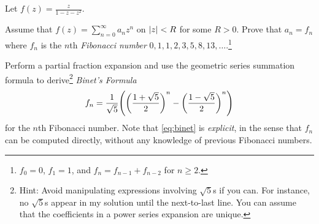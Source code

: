 \documentclass{../math135}
\begin{document}
\begin{exercise}
	Let \(f(z) = \frac{z}{1-z-z^2}\).
	\begin{problems}
  \item Assume that \(f(z) = \sum_{n=0}^{\infty} a_n z^n\) on
    \(\lvert z\rvert < R\) for some \(R > 0\).  Prove that \(a_n = f_n\) where
    \(f_n\) is the \(n\)th \emph{Fibonacci number}
    \(0,1,1,2,3,5,8,13,\ldots\).\footnote{\(f_0 = 0\), \(f_1 = 1\),
      and \(f_n = f_{n-1}+ f_{n-2}\) for \(n \geq 2\).}

    \begin{solution}

    \end{solution}

  \item Perform a partial fraction expansion and use the geometric
    series summation formula to derive\footnote{Hint: Avoid
      manipulating expressions involving \(\sqrt 5\)s if you can.  For
      instance, no \(\sqrt 5\)s appear in my solution until the
      next-to-last line.  You can assume that the coefficients in a
      power series expansion are unique. } \emph{Binet's Formula}
    \begin{equation}
      f_n = \frac{1}{\sqrt 5} \prn*{
        \prn*{\frac{1 + \sqrt 5}{2}}^n
        - \prn*{\frac{1 - \sqrt 5}{2}}^n
      }
      \label{eq:binet}
    \end{equation}
    for the \(n\)th Fibonacci number.  Note that \eqref{eq:binet} is
    \emph{explicit}, in the sense that \(f_n\) can be computed
    directly, without any knowledge of previous Fibonacci numbers.

    \begin{solution}

    \end{solution}

	\end{problems}
\end{exercise}
\end{document}
